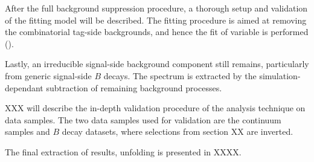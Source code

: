 After the full background suppression procedure, a thorough setup and validation of the fitting model will be described.
The fitting procedure is aimed at removing the combinatorial tag-side backgrounds, and hence the fit of \Mbc variable is performed ().

Lastly, an irreducible signal-side background component still remains, particularly from generic signal-side $B$ decays.
The \EB spectrum is extracted by the simulation-dependant subtraction of remaining background processes.

XXX will describe the in-depth validation procedure of the analysis technique on data samples.
The two data samples used for validation are the continuum samples and $B$ decay datasets, where selections from section XX are inverted.

The final extraction of results, unfolding is presented in XXXX.

